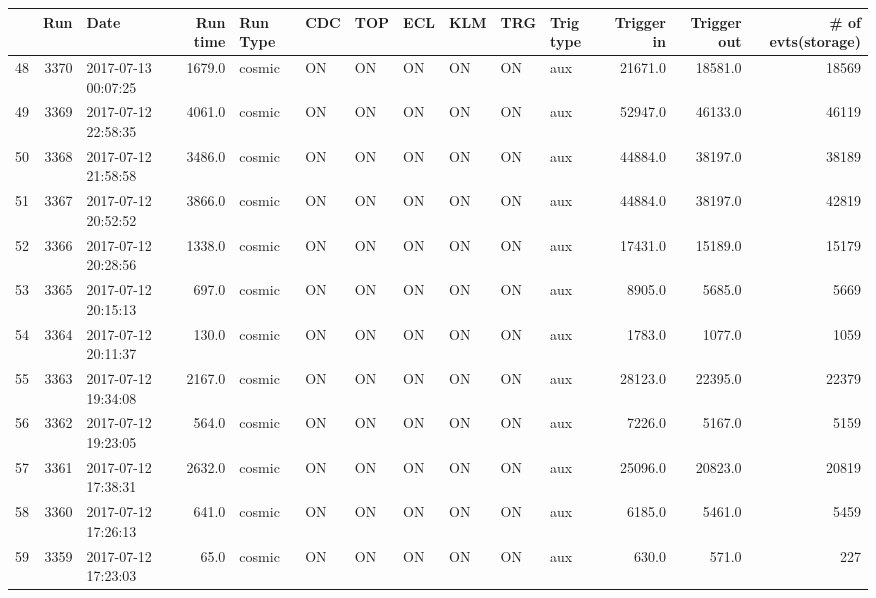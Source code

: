 \begin{tabular}{lrlrlllllllrrr}
\toprule
{} &   Run &                 Date &  Run time & Run Type & CDC &  TOP &  ECL & KLM &  TRG & Trig type &  Trigger in &  Trigger out &  \# of evts(storage) \\
\midrule
48  &  3370 &  2017-07-13 00:07:25 &    1679.0 &   cosmic &  ON &   ON &   ON &  ON &   ON &       aux &     21671.0 &      18581.0 &               18569 \\
49  &  3369 &  2017-07-12 22:58:35 &    4061.0 &   cosmic &  ON &   ON &   ON &  ON &   ON &       aux &     52947.0 &      46133.0 &               46119 \\
50  &  3368 &  2017-07-12 21:58:58 &    3486.0 &   cosmic &  ON &   ON &   ON &  ON &   ON &       aux &     44884.0 &      38197.0 &               38189 \\
51  &  3367 &  2017-07-12 20:52:52 &    3866.0 &   cosmic &  ON &   ON &   ON &  ON &   ON &       aux &     44884.0 &      38197.0 &               42819 \\
52  &  3366 &  2017-07-12 20:28:56 &    1338.0 &   cosmic &  ON &   ON &   ON &  ON &   ON &       aux &     17431.0 &      15189.0 &               15179 \\
53  &  3365 &  2017-07-12 20:15:13 &     697.0 &   cosmic &  ON &   ON &   ON &  ON &   ON &       aux &      8905.0 &       5685.0 &                5669 \\
54  &  3364 &  2017-07-12 20:11:37 &     130.0 &   cosmic &  ON &   ON &   ON &  ON &   ON &       aux &      1783.0 &       1077.0 &                1059 \\
55  &  3363 &  2017-07-12 19:34:08 &    2167.0 &   cosmic &  ON &   ON &   ON &  ON &   ON &       aux &     28123.0 &      22395.0 &               22379 \\
56  &  3362 &  2017-07-12 19:23:05 &     564.0 &   cosmic &  ON &   ON &   ON &  ON &   ON &       aux &      7226.0 &       5167.0 &                5159 \\
57  &  3361 &  2017-07-12 17:38:31 &    2632.0 &   cosmic &  ON &   ON &   ON &  ON &   ON &       aux &     25096.0 &      20823.0 &               20819 \\
58  &  3360 &  2017-07-12 17:26:13 &     641.0 &   cosmic &  ON &   ON &   ON &  ON &   ON &       aux &      6185.0 &       5461.0 &                5459 \\
59  &  3359 &  2017-07-12 17:23:03 &      65.0 &   cosmic &  ON &   ON &   ON &  ON &   ON &       aux &       630.0 &        571.0 &                 227 \\

\end{tabular}
